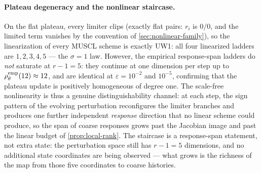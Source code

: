 \documentclass[pdflatex,sn-mathphys-num]{sn-jnl}%
\theoremstyle{thmstyleone}%
\theoremstyle{thmstyletwo}%
\theoremstyle{thmstylethree}%
\begin{document}
\paragraph{Plateau degeneracy and the nonlinear staircase.}
On the flat plateau, every limiter clips (exactly flat pairs: $r_i$ is $0/0$, and the limited term vanishes by the convention of \cref{sec:nonlinear-family}), so the linearization of every MUSCL scheme is exactly UW1: all four linearized ladders are $1,2,3,4,5$ --- the $\sigma=1$ law.
However, the empirical response-span ladders do \emph{not} saturate at $r-1=5$: they continue at one dimension per step up to $\rho^{\rm emp}_\theta(12) \approx 12$, and are identical at $\varepsilon=10^{-2}$ and $10^{-5}$, confirming that the plateau update is positively homogeneous of degree one.
The scale-free nonlinearity is thus a genuine distinguishability channel: at each step, the sign pattern of the evolving perturbation reconfigures the limiter branches and produces one further independent \emph{response} direction that no linear scheme could produce, so the span of coarse responses grows past the Jacobian image and past the linear budget of \cref{prop:local-rank}.
The staircase is a response-span statement, not extra state: the perturbation space still has $r-1=5$ dimensions, and no additional state coordinates are being observed --- what grows is the richness of the map from those five coordinates to coarse histories.
\end{document}
